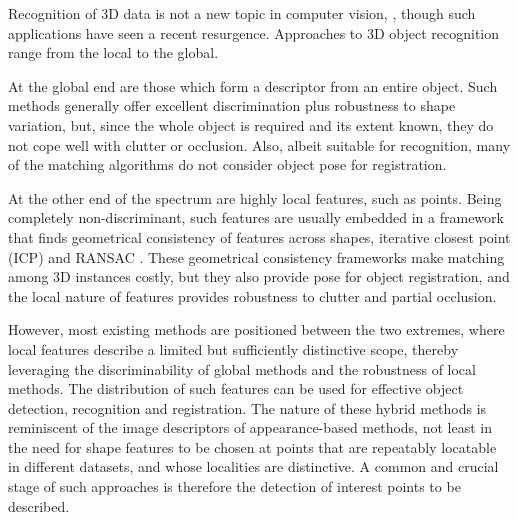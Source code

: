Recognition of 3D data is not a new topic in computer vision, \eg \cite{Fisher1987, Nevatia1977, Marr1978, Bolles1983}, though such applications have seen a recent resurgence. Approaches to 3D object recognition range from the local to the global. 

At the global end are those which form a descriptor from an entire object. Such methods generally offer excellent discrimination plus robustness to shape variation, but, since the whole object is required and its extent known, they do not cope well with clutter or occlusion. Also, albeit suitable for recognition, many of the matching algorithms do not consider object pose for registration. 

At the other end of the spectrum are highly local features, such as points. Being completely non-discriminant, such features are usually embedded in a framework that finds geometrical consistency of features across shapes, \eg iterative closest point (ICP) \cite{Besl1992} and RANSAC \cite{Brown2005, Papazov2011}. 
These geometrical consistency frameworks make matching among 3D instances costly, but they also provide pose for object registration, and the local nature of features provides robustness to clutter and partial occlusion. 

However, most existing methods are positioned between the two extremes, where local features describe a limited but sufficiently distinctive scope, thereby leveraging the discriminability of global methods and the robustness of local methods. 
The distribution of such features can be used for effective object detection, recognition and registration. The nature of these hybrid methods is reminiscent of the image descriptors of appearance-based methods, not least in the need for shape features to be chosen at points that are repeatably locatable in different datasets, and whose localities are distinctive. 
A common and crucial stage of such approaches is therefore the detection of interest points to be described.  

